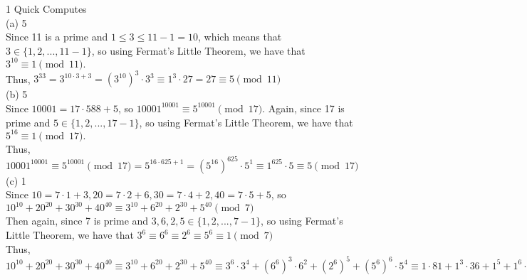 \documentclass{article}
\begin{document}
{\Large 1 Quick Computes} \\[.5cm]
(a) 5 \\[.3cm]
Since 11 is a prime and $1\leq3\leq11-1=10$, which means that $3\in\{1,2,...,11-1\}$, so using Fermat's Little Theorem, we have that $3^10\equiv1\pmod{11}.$ \\[.1cm]
Thus, $3^{33} = 3^{10\cdot3+3} = (3^{10})^3\cdot3^3\equiv1^3\cdot27 = 27\equiv5\pmod{11}$ \\[.5cm]
(b) 5 \\[.3cm]
Since $10001 = 17\cdot588 + 5$, so $10001^{10001}\equiv5^{10001}\pmod{17}$.
Again, since 17 is prime and $5\in\{1,2,...,17-1\}$, so using Fermat's Little Theorem, we have that $5^16\equiv1\pmod{17}.$ \\[.1cm]
Thus, $10001^{10001}\equiv5^{10001}\pmod{17} = 5^{16\cdot625+1} = (5^{16})^{625}\cdot5^1\equiv1^{625}\cdot5\equiv5\pmod{17}$ \\[.5cm]
(c) 1 \\[.3cm]
Since $10 = 7\cdot1 + 3, 20 = 7\cdot2 + 6, 30 = 7\cdot4 + 2, 40 = 7\cdot5 + 5$, so $10^{10} + 20^{20} + 30^{30} + 40^{40}\equiv 3^{10} + 6^{20} + 2^{30} + 5^{40}\pmod{7}$ \\[.1cm]
Then again, since 7 is prime and $3, 6, 2, 5\in\{1,2,...,7-1\}$, so using Fermat's Little Theorem, we have that $3^6\equiv6^6\equiv2^6\equiv5^6\equiv1\pmod{7}$ \\[.1cm]
Thus, $10^{10} + 20^{20} + 30^{30} + 40^{40}\equiv3^{10} + 6^{20} + 2^{30} + 5^{40}\equiv3^6\cdot3^4 + (6^6)^3\cdot6^2 + (2^6)^5 + (5^6)^6\cdot5^4\equiv1\cdot81 + 1^3\cdot 36 + 1^5 + 1^6\cdot625 = 81 + 36 + 1 + 625 = 743 = 7\cdot106 + 1\cdot1\pmod{7}$ \\[.1cm]
\end{document}
